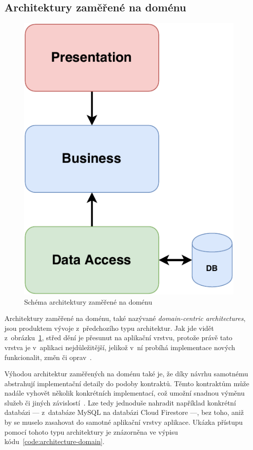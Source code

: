 \subsection{Architektury zaměřené na doménu}

\begin{figure}
    \centering
    \includegraphics[width=0.35\linewidth]{assets/technology-research/architecture/domain-centric.pdf}
    \caption{Schéma architektury zaměřené na doménu~\cite{architecture}}
    \label{fig:architecture_domain}
\end{figure}

Architektury zaměřené na doménu,
také nazývané \emph{domain-centric architectures},
jsou produktem vývoje z~předchozího typu architektur.
Jak jde vidět z~obrázku~\ref{fig:architecture_domain},
střed dění je přesunut na aplikační vrstvu,
protože právě tato vrstva je v~aplikaci nejdůležitější,
jelikož v~ní probíhá implementace nových funkcionalit,
změn či oprav~\cite{architecture}.
\emph{}~\cite[str.~140]{martin_clean_architecture}

Výhodou architektur zaměřených na doménu také je,
že díky návrhu samotnému abstrahují implementační detaily do podoby kontraktů.
Těmto kontraktům může nadále vyhovět několik konkrétních implementací,
což umožní snadnou výměnu služeb
či jiných závislostí~\cite[str.~135--146]{martin_clean_architecture}.
Lze tedy jednoduše nahradit například konkrétní databázi
--- z~databáze MySQL na databázi Cloud Firestore ---,
bez toho,
aniž by se muselo zasahovat do samotné aplikační vrstvy aplikace.
Ukázka přístupu pomocí tohoto typu architektury je znázorněna
ve výpisu kódu~\ref{code:architecture-domain}.


